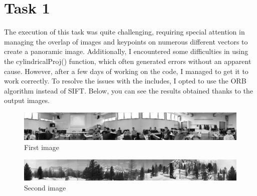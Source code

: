 
%
%         

%





\chapter{Task 1}
The execution of this task was quite challenging, requiring special attention in managing the overlap of images and keypoints on numerous different vectors to create a panoramic image. Additionally, I encountered some difficulties in using the cylindricalProj() function, which often generated errors without an apparent cause. However, after a few days of working on the code, I managed to get it to work correctly. To resolve the issues with the includes, I opted to use the ORB algorithm instead of SIFT. Below, you can see the results obtained thanks to the output images.

\begin{figure}[h]
	\centering
        \begin{minipage}{1\textwidth}
        		\centering
		\includegraphics[width=\linewidth]{images/source/1}
		\caption{First image}
		\label{fig:1a}
        \end{minipage}
\end{figure}


\begin{figure}[h]
	\centering
        \begin{minipage}{1\textwidth}
        		\centering
		\includegraphics[width=\linewidth]{images/source/2}
		\caption{Second image}
		\label{fig:1b}
        \end{minipage}
\end{figure}


